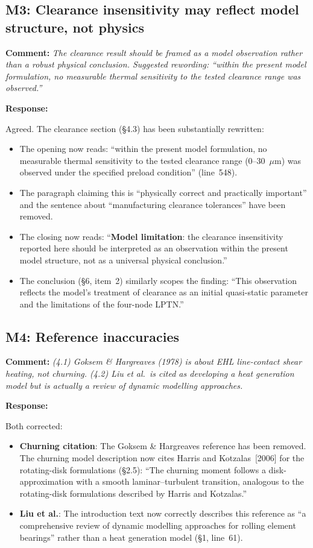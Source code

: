 \documentclass[11pt]{article}
\newcommand{\reviewer}[1]{\subsection*{#1}}
\newcommand{\comment}[1]{\textbf{Comment:} \textit{#1}\par\medskip}
\newcommand{\response}[1]{\textbf{Response:} \textcolor{response}{#1}\par\bigskip}
\begin{document}
\reviewer{M3: Clearance insensitivity may reflect model structure, not physics}

\comment{The clearance result should be framed as a model observation rather than a robust physical conclusion. Suggested rewording: ``within the present model formulation, no measurable thermal sensitivity to the tested clearance range was observed.''}

\response{Agreed. The clearance section (\S4.3) has been substantially rewritten:  

\begin{itemize}[nosep]
    \item The opening now reads: ``within the present model formulation, no measurable thermal sensitivity to the tested clearance range (0--30~$\mu$m) was observed under the specified preload condition'' (line~548).
    \item The paragraph claiming this is ``physically correct and practically important'' and the sentence about ``manufacturing clearance tolerances'' have been removed.
    \item The closing now reads: ``\textbf{Model limitation}: the clearance insensitivity reported here should be interpreted as an observation within the present model structure, not as a universal physical conclusion.''
    \item The conclusion (\S6, item~2) similarly scopes the finding: ``This observation reflects the model's treatment of clearance as an initial quasi-static parameter and the limitations of the four-node LPTN.''
\end{itemize}}


\reviewer{M4: Reference inaccuracies}

\comment{(4.1) Goksem \& Hargreaves (1978) is about EHL line-contact shear heating, not churning. (4.2) Liu et al.\ is cited as developing a heat generation model but is actually a review of dynamic modelling approaches.}

\response{Both corrected:
\begin{itemize}[nosep]
    \item \textbf{Churning citation}: The Goksem \& Hargreaves reference has been removed. The churning model description now cites Harris and Kotzalas~[2006] for the rotating-disk formulations (\S2.5): ``The churning moment follows a disk-approximation with a smooth laminar--turbulent transition, analogous to the rotating-disk formulations described by Harris and Kotzalas.''
    \item \textbf{Liu et al.}: The introduction text now correctly describes this reference as ``a comprehensive review of dynamic modelling approaches for rolling element bearings'' rather than a heat generation model (\S1, line~61).
\end{itemize}}
\end{document}
